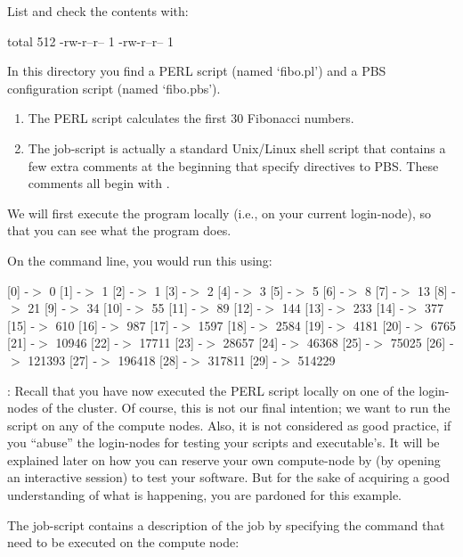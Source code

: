 List and check the contents with:

\begin{prompt}
total 512
-rw-r--r-- 1 %
-rw-r--r-- 1 %
\end{prompt}

In this directory you find a PERL script (named `fibo.pl') and a PBS
configuration script (named `fibo.pbs').

\begin{enumerate}
\item  The PERL script calculates the first 30 Fibonacci numbers.
\item  The job-script is actually a standard Unix/Linux shell script that
  contains a few extra comments at the beginning that specify directives to
  PBS.  These comments all begin with .
\end{enumerate}

We will first execute the program locally (i.e., on your current login-node),
so that you can see what the program does.

On the command line, you would run this using:
\begin{prompt}
[0] -$>$ 0
[1] -$>$ 1
[2] -$>$ 1
[3] -$>$ 2
[4] -$>$ 3
[5] -$>$ 5
[6] -$>$ 8
[7] -$>$ 13
[8] -$>$ 21
[9] -$>$ 34
[10] -$>$ 55
[11] -$>$ 89
[12] -$>$ 144
[13] -$>$ 233
[14] -$>$ 377
[15] -$>$ 610
[16] -$>$ 987
[17] -$>$ 1597
[18] -$>$ 2584
[19] -$>$ 4181
[20] -$>$ 6765
[21] -$>$ 10946
[22] -$>$ 17711
[23] -$>$ 28657
[24] -$>$ 46368
[25] -$>$ 75025
[26] -$>$ 121393
[27] -$>$ 196418
[28] -$>$ 317811
[29] -$>$ 514229
\end{prompt}

: Recall that you have now executed the PERL script locally on
one of the login-nodes of the \hpc cluster.  Of course, this is not our final
intention; we want to run the script on any of the compute nodes. Also, it is
not considered as good practice, if you ``abuse'' the login-nodes for testing
your scripts and executable's. It will be explained later on how you can
reserve your own compute-node by (by opening an interactive session) to test
your software. But for the sake of acquiring a good understanding of what is
happening, you are pardoned for this example.

The job-script contains a description of the job by specifying the command that
need to be executed on the compute node:


